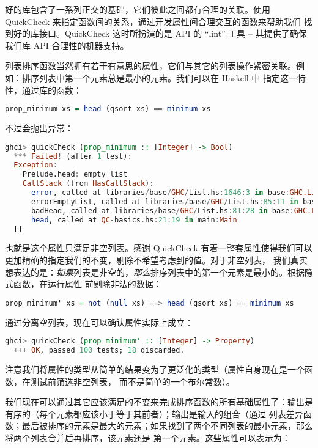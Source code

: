 \documentclass[./main.tex]{subfiles}
\begin{document}
好的库包含了一系列正交的基础，它们彼此之间都有合理的关联。使用 QuickCheck 来指定函数间的关系，通过开发属性间合理交互的函数来帮助我们
找到好的库接口。QuickCheck 这时所扮演的是 API 的 “lint” 工具 -- 其提供了确保我们库 API 合理性的机器支持。

列表排序函数当然拥有若干有意思的属性，它们与其它的列表操作紧密关联。例如：排序列表中第一个元素总是最小的元素。我们可以在 Haskell 中
指定这一特性，通过库的函数：

\begin{lstlisting}[language=Haskell]
  prop_minimum xs = head (qsort xs) == minimum xs
\end{lstlisting}

不过会抛出异常：

\begin{lstlisting}[language=Haskell]
  ghci> quickCheck (prop_minimum :: [Integer] -> Bool)
  *** Failed! (after 1 test):
  Exception:
    Prelude.head: empty list
    CallStack (from HasCallStack):
      error, called at libraries/base/GHC/List.hs:1646:3 in base:GHC.List
      errorEmptyList, called at libraries/base/GHC/List.hs:85:11 in base:GHC.List
      badHead, called at libraries/base/GHC/List.hs:81:28 in base:GHC.List
      head, called at QC-basics.hs:21:19 in main:Main
  []
\end{lstlisting}

也就是这个属性只满足非空列表。感谢 QuickCheck 有着一整套属性使得我们可以更加精确的指定我们的不变，剔除不希望考虑到的值。对于非空列表，
我们真实想表达的是：\textit{如果}列表是非空的，\textit{那么}排序列表中的第一个元素是最小的。根据\acode{(==>)}隐式函数，在运行属性
前剔除非法的数据：

\begin{lstlisting}[language=Haskell]
  prop_minimum' xs = not (null xs) ==> head (qsort xs) == minimum xs
\end{lstlisting}

通过分离空列表，现在可以确认属性实际上成立：

\begin{lstlisting}[language=Haskell]
  ghci> quickCheck (prop_minimum' :: [Integer] -> Property)
  +++ OK, passed 100 tests; 18 discarded.
\end{lstlisting}

注意我们将属性的类型从简单的结果变为了更泛化的类型（属性自身现在是一个函数，在测试前筛选非空列表，
而不是简单的一个布尔常数）。

我们现在可以通过其它应该满足的不变来完成排序函数的所有基础属性了：输出是有序的（每个元素都应该小于等于其前者）；输出是输入的组合（通过
列表差异函数\acode{(\\\\)}；最后被排序的元素是最大的元素；如果找到了两个不同列表的最小元素，那么将两个列表合并后再排序，该元素还是
第一个元素。这些属性可以表示为：
\end{document}
